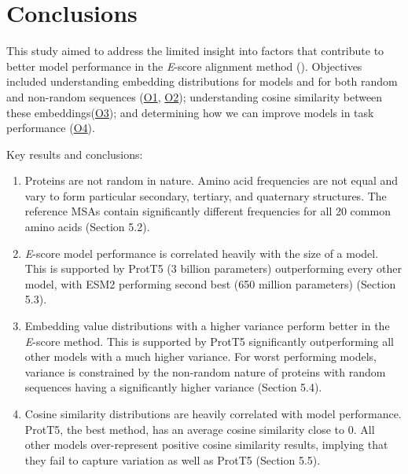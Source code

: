 \chapter{Conclusions}
This study aimed to address the limited insight into factors that contribute to better model performance in the \textit{E}-score alignment method (\cite{Ashrafzadeh:2023}). Objectives included understanding embedding distributions for models and for both random and non-random sequences (\hyperlink{O1}{O1}, \hyperlink{O2}{O2}); understanding cosine similarity between these embeddings(\hyperlink{O3}{O3}); and determining how we can improve models in task performance (\hyperlink{O4}{O4}). 

\noindent Key results and conclusions:
\begin{enumerate}
    \item{Proteins are not random in nature. Amino acid frequencies are not equal and vary to form particular secondary, tertiary, and quaternary structures. The reference MSAs contain significantly different frequencies for all 20 common amino acids (Section 5.2).}
    \item{\textit{E}-score model performance is correlated heavily with the size of a model. This is supported by ProtT5 (3 billion parameters) outperforming every other model, with ESM2 performing second best (650 million parameters) (Section 5.3).}
    \item{Embedding value distributions with a higher variance perform better in the \textit{E}-score method. This is supported by ProtT5 significantly outperforming all other models with a much higher variance. For worst performing models, variance is constrained by the non-random nature of proteins with random sequences having a significantly higher variance (Section 5.4).}
    \item{Cosine similarity distributions are heavily correlated with model performance. ProtT5, the best method, has an average cosine similarity close to 0. All other models over-represent positive cosine similarity results, implying that they fail to capture variation as well as ProtT5 (Section 5.5).}
\end{enumerate}